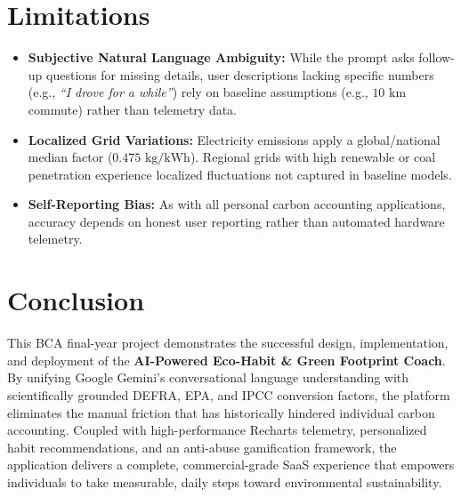 \documentclass[12pt,a4paper]{article}
\begin{document}
\section{Limitations}
\begin{itemize}
    \item \textbf{Subjective Natural Language Ambiguity:} While the prompt asks follow-up questions for missing details, user descriptions lacking specific numbers (e.g., \emph{``I drove for a while''}) rely on baseline assumptions (e.g., $10\text{ km}$ commute) rather than telemetry data.
    \item \textbf{Localized Grid Variations:} Electricity emissions apply a global/national median factor ($0.475\text{ kg/kWh}$). Regional grids with high renewable or coal penetration experience localized fluctuations not captured in baseline models.
    \item \textbf{Self-Reporting Bias:} As with all personal carbon accounting applications, accuracy depends on honest user reporting rather than automated hardware telemetry.
\end{itemize}

\section{Conclusion}
This BCA final-year project demonstrates the successful design, implementation, and deployment of the \textbf{AI-Powered Eco-Habit \& Green Footprint Coach}. By unifying Google Gemini's conversational language understanding with scientifically grounded DEFRA, EPA, and IPCC conversion factors, the platform eliminates the manual friction that has historically hindered individual carbon accounting. Coupled with high-performance Recharts telemetry, personalized habit recommendations, and an anti-abuse gamification framework, the application delivers a complete, commercial-grade SaaS experience that empowers individuals to take measurable, daily steps toward environmental sustainability.

\end{document}
